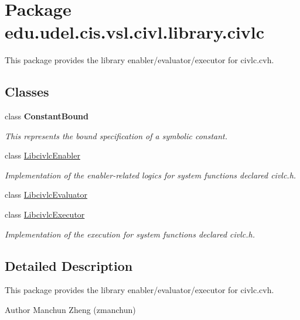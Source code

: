 \hypertarget{namespaceedu_1_1udel_1_1cis_1_1vsl_1_1civl_1_1library_1_1civlc}{}\section{Package edu.\+udel.\+cis.\+vsl.\+civl.\+library.\+civlc}
\label{namespaceedu_1_1udel_1_1cis_1_1vsl_1_1civl_1_1library_1_1civlc}


This package provides the library enabler/evaluator/executor for civlc.\+cvh.  


\subsection*{Classes}
\begin{DoxyCompactItemize}
\item 
class {\bfseries Constant\+Bound}
\begin{DoxyCompactList}\small\item\em This represents the bound specification of a symbolic constant. \end{DoxyCompactList}\item 
class \hyperlink{classedu_1_1udel_1_1cis_1_1vsl_1_1civl_1_1library_1_1civlc_1_1LibcivlcEnabler}{Libcivlc\+Enabler}
\begin{DoxyCompactList}\small\item\em Implementation of the enabler-\/related logics for system functions declared civlc.\+h. \end{DoxyCompactList}\item 
class \hyperlink{classedu_1_1udel_1_1cis_1_1vsl_1_1civl_1_1library_1_1civlc_1_1LibcivlcEvaluator}{Libcivlc\+Evaluator}
\item 
class \hyperlink{classedu_1_1udel_1_1cis_1_1vsl_1_1civl_1_1library_1_1civlc_1_1LibcivlcExecutor}{Libcivlc\+Executor}
\begin{DoxyCompactList}\small\item\em Implementation of the execution for system functions declared civlc.\+h. \end{DoxyCompactList}\end{DoxyCompactItemize}


\subsection{Detailed Description}
This package provides the library enabler/evaluator/executor for civlc.\+cvh. 

\begin{DoxyAuthor}{Author}
Manchun Zheng (zmanchun) 
\end{DoxyAuthor}
